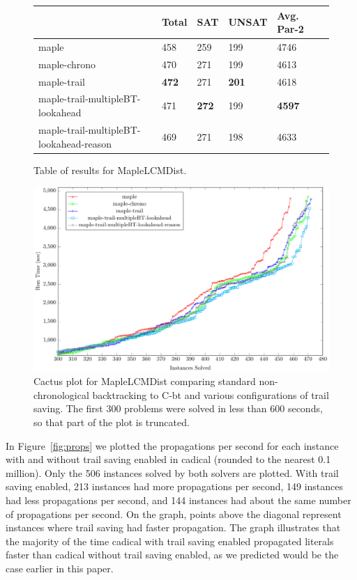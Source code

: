 \documentclass[runningheads]{llncs}
\newcommand{\cbt}{C-bt\xspace}
\begin{document}
\begin{figure}
\centering
    \begin{tabular}{|l|l|l|l|l|l|}
      \hline
      & Total & SAT & UNSAT & Avg. Par-2 \\ \hline
      maple           & 458          & 259 &  199  & 4746                             \\ \hline
      maple-chrono   & 470          & 271 &  199  & 4613                             \\ \hline
      maple-trail    & \textbf{472}          & 271 &  \textbf{201}  & 4618                \\ \hline
      maple-trail-multipleBT-lookahead & 471 & \textbf{272} &  199  & \textbf{4597}        \\ \hline
      maple-trail-multipleBT-lookahead-reason & 469 & 271 & 198 & 4633 \\ \hline
    \end{tabular}
    \caption{Table of results for MapleLCMDist.}
    \label{fig:maple}
\end{figure}

\begin{figure}\centering\includegraphics[scale=0.65]{figures/cactus_maple_new.pdf}\caption{\small{Cactus plot for MapleLCMDist comparing standard non-chronological backtracking to \cbt and various configurations of trail saving. The first 300 problems were solved in less than 600 seconds, so that part of the plot is truncated.}}\label{fig:cactus_maple}\end{figure}

In Figure~\ref{fig:props} we plotted the propagations per second for
each instance with and without trail saving enabled in cadical (rounded
to the nearest 0.1 million). Only
the 506 instances solved by both solvers are plotted. With trail saving
enabled, 213 instances had more propagations per second, 149 instances
had less propagations per second, and 144 instances had about the same
number of propagations per second. On the graph, points above the diagonal
represent instances where trail saving had faster propagation. The
graph illustrates that the majority of the time
cadical with trail saving enabled propagated literals faster than
cadical without trail saving enabled, as we predicted would be the
case earlier in this paper.
\end{document}
